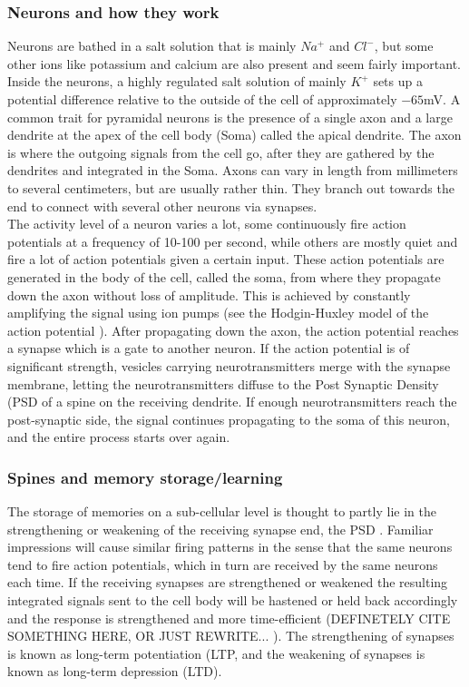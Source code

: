 \documentclass[main.tex]{subfiles}
\begin{document}
\subsubsection{Neurons and how they work}
Neurons are bathed in a salt solution that is mainly $Na^+$ and $Cl^-$, but some other ions like potassium and calcium are also present and seem fairly important. 
Inside the neurons, a highly regulated salt solution of mainly $K^+$ sets up a potential difference relative to the outside of the cell of approximately $-65$mV.
A common trait for pyramidal neurons is the presence of a single axon and a large dendrite at the apex of the cell body (Soma) called the apical dendrite. 
The axon is where the outgoing signals from the cell go, after they are gathered by the dendrites and integrated in the Soma. 
Axons can vary in length from millimeters to several centimeters, but are usually rather thin. They branch out towards the end to connect with several other neurons via synapses. \\

The activity level of a neuron varies a lot, some continuously fire action potentials at a frequency of 10-100 per second, while others are mostly quiet and fire a lot of action potentials given a certain input. 
These action potentials are generated in the body of the cell, called the soma, from where they propagate down the axon without loss of amplitude. 
This is achieved by constantly amplifying the signal using ion pumps (see the Hodgin-Huxley model of the action potential \cite{graham2011principles}).
After propagating down the axon, the action potential reaches a synapse which is a gate to another neuron. 
If the action potential is of significant strength, vesicles carrying neurotransmitters merge with the synapse membrane, letting the neurotransmitters diffuse to the Post Synaptic Density (PSD of a spine on the receiving dendrite.
If enough neurotransmitters reach the post-synaptic side, the signal continues propagating to the soma of this neuron, and the entire process starts over again.

\subsubsection{Spines and memory storage/learning}
The storage of memories on a sub-cellular level is thought to partly lie in the strengthening or weakening of the receiving synapse end, the PSD \cite{}. 
Familiar impressions will cause similar firing patterns in the sense that the same neurons tend to fire action potentials, which in turn are received by the same neurons each time. 
If the receiving synapses are strengthened or weakened the resulting integrated signals sent to the cell body will be hastened or held back accordingly and the response is strengthened and more time-efficient (DEFINETELY CITE SOMETHING HERE, OR JUST REWRITE... \cite{}). 
The strengthening of synapses is known as long-term potentiation (LTP, and the weakening of synapses is known as long-term depression (LTD). \\
\end{document}
